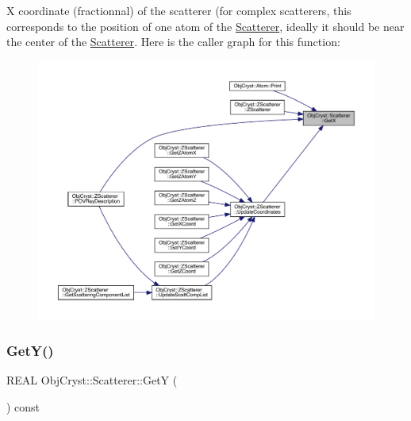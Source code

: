 X coordinate (fractionnal) of the scatterer (for complex scatterers, this corresponds to the position of one atom of the \mbox{\hyperlink{class_obj_cryst_1_1_scatterer}{Scatterer}}, ideally it should be near the center of the \mbox{\hyperlink{class_obj_cryst_1_1_scatterer}{Scatterer}}. Here is the caller graph for this function\+:
\nopagebreak
\begin{figure}[H]
\begin{center}
\leavevmode
\includegraphics[width=350pt]{class_obj_cryst_1_1_scatterer_aa46e022b2ea81079b4d02da07b6bec4a_icgraph}
\end{center}
\end{figure}
\mbox{\label{class_obj_cryst_1_1_scatterer_aeebaad938c35a825e78cf49a5fba5d3c}} 
\subsubsection{\texorpdfstring{GetY()}{GetY()}}
{\footnotesize\ttfamily R\+E\+AL Obj\+Cryst\+::\+Scatterer\+::\+GetY (\begin{DoxyParamCaption}{ }\end{DoxyParamCaption}) const}

